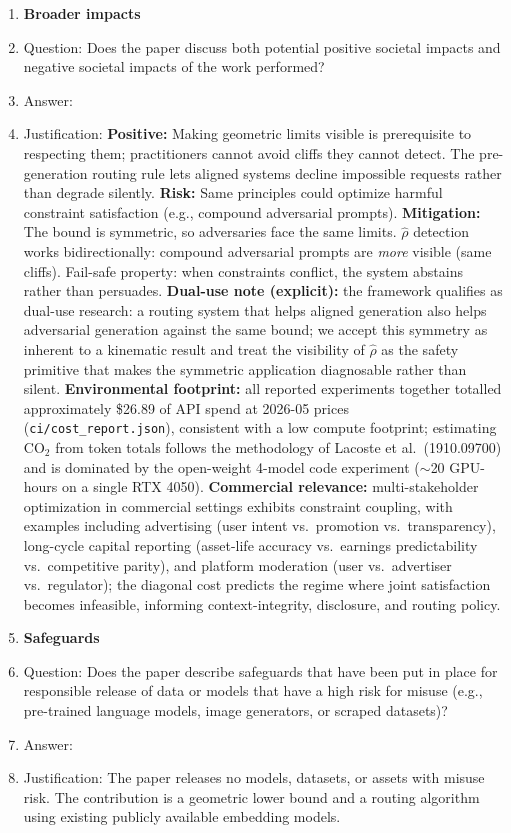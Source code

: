 \begin{enumerate}
\item {\bf Broader impacts}
    \item[] Question: Does the paper discuss both potential positive societal impacts and negative societal impacts of the work performed?
    \item[] Answer: \answerYes{}
    \item[] Justification: \textbf{Positive:} Making geometric limits visible is prerequisite to respecting them; practitioners cannot avoid cliffs they cannot detect. The pre-generation routing rule lets aligned systems decline impossible requests rather than degrade silently. \textbf{Risk:} Same principles could optimize harmful constraint satisfaction (e.g., compound adversarial prompts). \textbf{Mitigation:} The bound is symmetric, so adversaries face the same limits. $\hat{\rho}$ detection works bidirectionally: compound adversarial prompts are \emph{more} visible (same cliffs). Fail-safe property: when constraints conflict, the system abstains rather than persuades. \textbf{Dual-use note (explicit):} the framework qualifies as dual-use research: a routing system that helps aligned generation also helps adversarial generation against the same bound; we accept this symmetry as inherent to a kinematic result and treat the visibility of $\hat{\rho}$ as the safety primitive that makes the symmetric application diagnosable rather than silent. \textbf{Environmental footprint:} all reported experiments together totalled approximately \$26.89 of API spend at 2026-05 prices (\texttt{ci/cost\_report.json}), consistent with a low compute footprint; estimating CO$_2$ from token totals follows the methodology of Lacoste et al.\ (1910.09700) and is dominated by the open-weight 4-model code experiment ($\sim$20 GPU-hours on a single RTX 4050). \textbf{Commercial relevance:} multi-stakeholder optimization in commercial settings exhibits constraint coupling, with examples including advertising (user intent vs.\ promotion vs.\ transparency), long-cycle capital reporting (asset-life accuracy vs.\ earnings predictability vs.\ competitive parity), and platform moderation (user vs.\ advertiser vs.\ regulator); the diagonal cost predicts the regime where joint satisfaction becomes infeasible, informing context-integrity, disclosure, and routing policy.

\item {\bf Safeguards}
    \item[] Question: Does the paper describe safeguards that have been put in place for responsible release of data or models that have a high risk for misuse (e.g., pre-trained language models, image generators, or scraped datasets)?
    \item[] Answer: \answerNA{}
    \item[] Justification: The paper releases no models, datasets, or assets with misuse risk. The contribution is a geometric lower bound and a routing algorithm using existing publicly available embedding models.


\end{enumerate}

